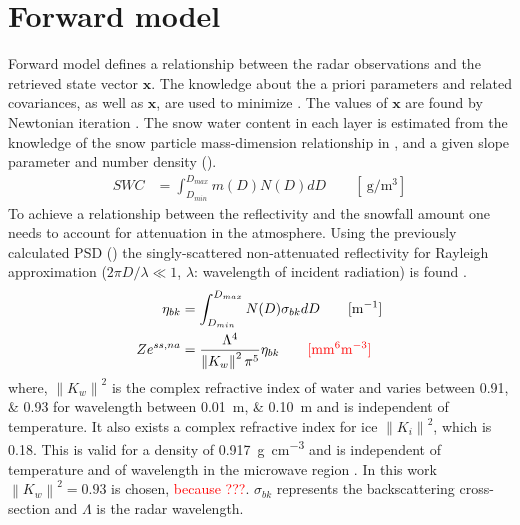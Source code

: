 \section{Forward model}
Forward model defines a relationship between the radar observations and the retrieved state vector $\mathbf{x}$. The knowledge about the a priori parameters and related covariances, as well as $\mathbf{x}$, are used to minimize . The values of $\mathbf{x}$ are found by Newtonian iteration \cite[Eq. 5]{wood_estimating_2014}.
\newline
The snow water content in each layer is estimated from the knowledge of the snow particle mass-dimension relationship in , and a given slope parameter and number density (). %
\begin{align}
	SWC & = \int_{D_{min}}^{D_{max}} m(D) N(D) dD \qquad [\SI{}{\gram\per\cubic\metre}] \label{eq:SWC}
\end{align}
To achieve a relationship between the reflectivity and the snowfall amount one needs to account for attenuation in the atmosphere. Using the previously calculated PSD () the singly-scattered non-attenuated reflectivity for Rayleigh approximation ($2\pi D/\lambda \ll 1$, $\lambda$: wavelength of incident radiation) is found \citep{lecuyer_estimation-based_2002,kulie_utilizing_2009,wood_microphysical_2015}. 
\begin{align}
	\eta_{bk} & = \int_{D_{min}}^{D_{max}} N(D) \sigma_{bk} dD \qquad [\SI{}{\per\metre}] \nonumber \\
	Ze^{ss,na} & = \frac{\Lambda^4}{\left\| K_w \right\|^2 \pi^5} \eta_{bk} \qquad \textcolor{red}{[\SI{}{\mm^6\metre^{-3}}]} \label{eq:singleZ}
\end{align}
where, $\left\| K_w \right\|^2$ is the complex refractive index of water and varies between \numlist{0.91;0.93} for wavelength between \SIlist{0.01;0.10}{\metre} and is independent of temperature. It also exists a  complex refractive index for ice $\left\| K_i \right\|^2$, which is \SI{0.18}{}. This is valid for a density of \SI{0.917}{\gram\per\cubic\cm} and is independent of temperature and of wavelength in the microwave region \citep{doviak_doppler_1993}. In this work  $\left\| K_w \right\|^2 = 0.93$ is chosen, \textcolor{red}{because ???}. $\sigma_{bk}$ represents the backscattering cross-section and $\Lambda$ is the radar wavelength. 
\\
